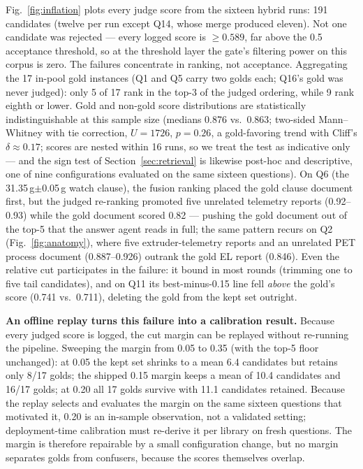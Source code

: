 \documentclass[preprint,12pt]{elsarticle}
\begin{document}
Fig.~\ref{fig:inflation} plots every judge score from the sixteen hybrid
runs: 191 candidates (twelve per run except Q14, whose merge produced
eleven). Not one candidate was rejected --- every logged score is
$\geq 0.589$, far above the 0.5 acceptance threshold, so at the threshold
layer the gate's filtering power on this corpus is zero. The failures
concentrate in ranking, not acceptance. Aggregating the 17 in-pool gold
instances (Q1 and Q5 carry two golds each; Q16's gold was never judged):
only 5 of 17 rank in the top-3 of the judged ordering, while 9 rank eighth
or lower. Gold and non-gold score distributions are statistically
indistinguishable at this sample size (medians 0.876 vs.\ 0.863;
two-sided Mann--Whitney with tie correction, $U = 1726$, $p = 0.26$, a
gold-favoring trend with Cliff's
$\delta \approx 0.17$; scores are nested within 16 runs, so we treat the
test as indicative only --- and the sign test of
Section~\ref{sec:retrieval} is likewise post-hoc and descriptive, one of
nine configurations evaluated on the same sixteen questions). On Q6 (the 31.35\,g$\pm$0.05\,g watch
clause), the fusion ranking placed the gold clause document first, but the
judged re-ranking promoted five unrelated telemetry reports (0.92--0.93)
while the gold document scored 0.82 --- pushing the gold document out of
the top-5 that the answer agent reads in full; the same pattern recurs on
Q2 (Fig.~\ref{fig:anatomy}), where five extruder-telemetry reports and an
unrelated PET process document (0.887--0.926) outrank the gold EL report
(0.846). Even the relative cut participates in the failure: it
bound in most rounds (trimming one to five tail candidates), and on Q11
its best-minus-0.15 line fell \emph{above} the gold's score (0.741 vs.\
0.711), deleting the gold from the kept set outright.

\textbf{An offline replay turns this failure into a calibration result.}
Because every judged score is logged, the cut margin can be replayed
without re-running the pipeline. Sweeping the margin from 0.05 to 0.35
(with the top-5 floor unchanged): at 0.05 the kept set shrinks to a mean
6.4 candidates but retains only 8/17 golds; the shipped 0.15 margin keeps
a mean of 10.4 candidates and 16/17 golds; at 0.20 all 17 golds survive
with 11.1 candidates retained. Because the replay selects and evaluates
the margin on the same sixteen questions that motivated it, 0.20 is an
in-sample observation, not a validated setting; deployment-time
calibration must re-derive it per library on fresh questions. The margin
is therefore repairable by a
small configuration change, but no margin separates golds from
confusers, because the scores themselves overlap.
\end{document}
